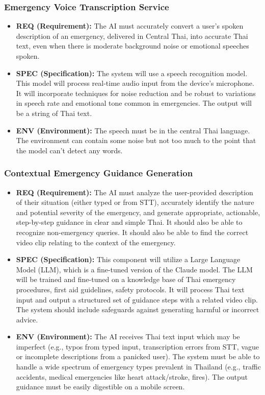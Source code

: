 \subsubsection{Emergency Voice Transcription Service}
\label{ssubsec:req_voice_transcription}
\begin{itemize}
    \item \textbf{REQ (Requirement):} The AI must accurately convert a user's spoken description of an emergency, delivered in Central Thai, into accurate Thai text, even when there is moderate background noise or emotional speeches spoken.
    \item \textbf{SPEC (Specification):} The system will use a speech recognition model. This model will process real-time audio input from the device's microphone. It will incorporate techniques for noise reduction and be robust to variations in speech rate and emotional tone common in emergencies. The output will be a string of Thai text.
    \item \textbf{ENV (Environment):} The speech must be in the central Thai language. The environment can contain some noise but not too much to the point that the model can’t detect any words.
\end{itemize}

\subsubsection{Contextual Emergency Guidance Generation}
\label{ssubsec:req_guidance_generation}
\begin{itemize}
    \item \textbf{REQ (Requirement):} The AI must analyze the user-provided description of their situation (either typed or from STT), accurately identify the nature and potential severity of the emergency, and generate appropriate, actionable, step-by-step guidance in clear and simple Thai. It should also be able to recognize non-emergency queries. It should also be able to find the correct video clip relating to the context of the emergency.
    \item \textbf{SPEC (Specification):} This component will utilize a Large Language Model (LLM), which is a fine-tuned version of the Claude model. The LLM will be trained and fine-tuned on a knowledge base of Thai emergency procedures, first aid guidelines, safety protocols. It will process Thai text input and output a structured set of guidance steps with a related video clip. The system should include safeguards against generating harmful or incorrect advice.
    \item \textbf{ENV (Environment):} The AI receives Thai text input which may be imperfect (e.g., typos from typed input, transcription errors from STT, vague or incomplete descriptions from a panicked user). The system must be able to handle a wide spectrum of emergency types prevalent in Thailand (e.g., traffic accidents, medical emergencies like heart attack/stroke, fires). The output guidance must be easily digestible on a mobile screen.
\end{itemize}

